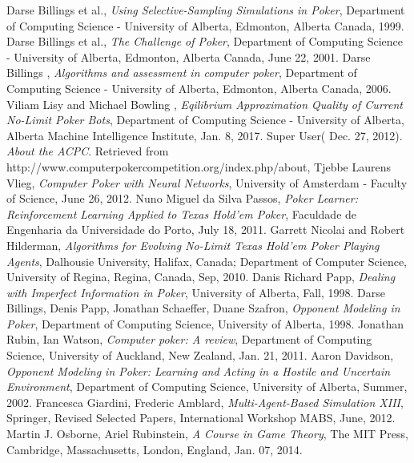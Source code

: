 %
%
\begin{thebibliography}{9}
  Darse Billings et al.,
  \textit{Using Selective-Sampling Simulations in Poker},
  Department of Computing Science - University of Alberta, Edmonton,
  Alberta Canada,
  1999.
  Darse Billings et al.,
  \textit{The Challenge of Poker},
  Department of Computing Science - University of Alberta, Edmonton,
  Alberta Canada,
  June 22, 2001.
  Darse Billings ,
  \textit{Algorithms and assessment in computer poker},
  Department of Computing Science - University of Alberta, Edmonton,
  Alberta Canada,
  2006.
  Viliam Lisy and Michael Bowling ,
  \textit{Eqilibrium Approximation Quality of Current No-Limit Poker Bots},
  Department of Computing Science - University of Alberta, Alberta Machine Intelligence Institute,
  Jan. 8, 2017.
  Super User( Dec. 27, 2012).
  \textit{About the ACPC}. Retrieved from http://www.computerpokercompetition.org/index.php/about,
  Tjebbe Laurens Vlieg,
  \textit{Computer Poker with Neural Networks},
  University of Amsterdam - Faculty of Science, 
  June 26, 2012.
  Nuno Miguel da Silva Passos,
  \textit{Poker Learner: Reinforcement Learning Applied to Texas Hold'em Poker},
  Faculdade de Engenharia da Universidade do Porto, 
  July 18, 2011.
  Garrett Nicolai and Robert Hilderman,
  \textit{Algorithms for Evolving No-Limit Texas Hold'em Poker Playing Agents},
  Dalhousie University, Halifax, Canada; Department of Computer Science, University of Regina, Regina, Canada, 
  Sep, 2010.
  Danis Richard Papp,
  \textit{Dealing with Imperfect Information in Poker},
  University of Alberta, 
 Fall, 1998.
  Darse Billings, Denis Papp, Jonathan Schaeffer, Duane Szafron,
  \textit{Opponent Modeling in Poker},
  Department of Computing Science, University of Alberta, 
 1998.
 Jonathan Rubin, Ian Watson,
  \textit{Computer poker: A review},
  Department of Computing Science, University of Auckland, New Zealand, 
 Jan. 21, 2011.
Aaron Davidson, 
  \textit{Opponent Modeling in Poker: Learning and Acting in a Hostile and Uncertain Environment},
  Department of Computing Science, University of Alberta, 
 Summer, 2002.
Francesca Giardini, Frederic Amblard, 
  \textit{Multi-Agent-Based Simulation XIII},
 Springer, Revised Selected Papers, International Workshop MABS, 
 June, 2012.
Martin J. Osborne, Ariel Rubinstein, 
  \textit{A Course in Game Theory},
 The MIT Press, Cambridge, Massachusetts, London, England, 
 Jan. 07, 2014.
\end{thebibliography}

\FloatBarrier\label{end-of-document}


